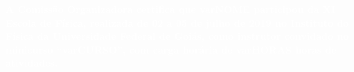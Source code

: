 \documentclass[fontsize=14pt]{scrartcl}
\begin{document}
\thispagestyle{empty}
\vspace*{7.5cm}
\hspace{7cm}
\begin{minipage}[t][7cm][t]{19cm}
\normalfont \bfseries
\textcolor{white}{A Comissão Organizadora certifica que varNOME participou da \mbox{XI} \mbox{Escola} de \mbox{Física}, realizada de 02 a 05 de julho de 2019 no Instituto do Física da Universidade Federal de Goiás, como instrutor convidado no minicurso ``varCURSO'', com carga horária de varHORAS horas de atividades.}
\end{minipage}
\end{document}
